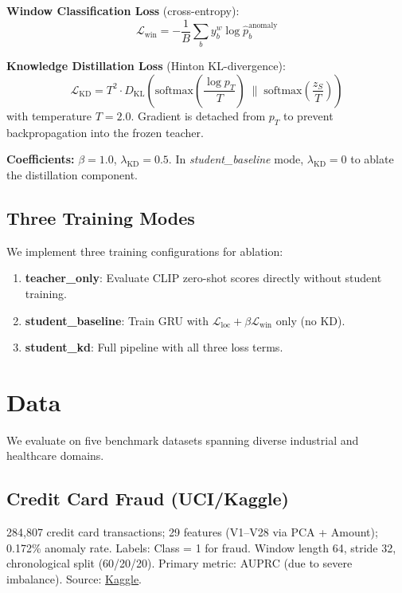 \documentclass[10pt,twocolumn]{article}
\begin{document}
\textbf{Window Classification Loss} (cross-entropy):
\begin{equation}
\mathcal{L}_{\text{win}} = -\frac{1}{B}\sum_b y_b^w \log \hat{p}_b^{\text{anomaly}}
\end{equation}

\textbf{Knowledge Distillation Loss} (Hinton KL-divergence):
\begin{equation}
\mathcal{L}_{\text{KD}} = T^2 \cdot D_{\text{KL}}\!\left(\text{softmax}\!\left(\frac{\log p_T}{T}\right) \;\big\|\; \text{softmax}\!\left(\frac{z_S}{T}\right)\right)
\end{equation}
with temperature $T = 2.0$. Gradient is detached from $p_T$ to prevent backpropagation into the frozen teacher.

\textbf{Coefficients:} $\beta = 1.0$, $\lambda_{\text{KD}} = 0.5$. In \emph{student\_baseline} mode, $\lambda_{\text{KD}} = 0$ to ablate the distillation component.

\subsection{Three Training Modes}

We implement three training configurations for ablation:
\begin{enumerate}[leftmargin=*, itemsep=1pt]
    \item \textbf{teacher\_only}: Evaluate CLIP zero-shot scores directly without student training.
    \item \textbf{student\_baseline}: Train GRU with $\mathcal{L}_{\text{loc}} + \beta\mathcal{L}_{\text{win}}$ only (no KD).
    \item \textbf{student\_kd}: Full pipeline with all three loss terms.
\end{enumerate}

\section{Data}
\label{sec:data}

We evaluate on five benchmark datasets spanning diverse industrial and healthcare domains.

\subsection{Credit Card Fraud (UCI/Kaggle)}
284{,}807 credit card transactions; 29 features (V1--V28 via PCA + Amount); 0.172\% anomaly rate. Labels: Class = 1 for fraud. Window length 64, stride 32, chronological split (60/20/20). Primary metric: AUPRC (due to severe imbalance). Source: \href{https://www.kaggle.com/datasets/mlg-ulb/creditcardfraud}{Kaggle}.
\end{document}
